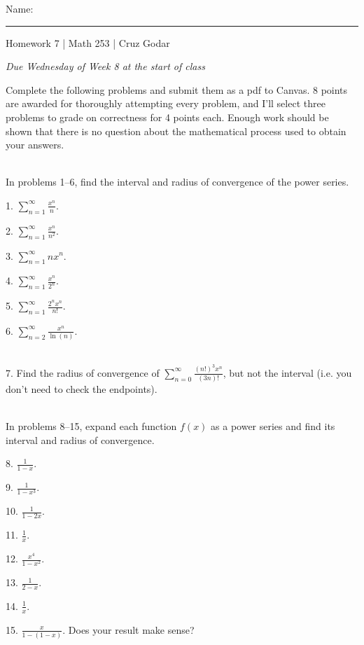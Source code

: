 \documentclass{article}
\begin{document}
\Large Name: \rule{2in}{0.15mm} \hfill Homework 7 | Math 253 | Cruz Godar \vspace{4pt} \normalsize

\textit{Due Wednesday of Week 8 at the start of class}

Complete the following problems and submit them as a pdf to Canvas. 8 points are awarded for thoroughly attempting every problem, and I'll select three problems to grade on correctness for 4 points each. Enough work should be shown that there is no question about the mathematical process used to obtain your answers.

~\\

In problems 1--6, find the interval and radius of convergence of the power series.

1. $\displaystyle \sum_{n = 1}^\infty \frac{x^n}{n}$.

2. $\displaystyle \sum_{n = 1}^\infty \frac{x^n}{n^2}$.

3. $\displaystyle \sum_{n = 1}^\infty nx^n$.

4. $\displaystyle \sum_{n = 1}^\infty \frac{x^n}{2^n}$.

5. $\displaystyle \sum_{n = 1}^\infty \frac{2^n x^n}{n!}$.

6. $\displaystyle \sum_{n = 2}^\infty \frac{x^n}{\ln(n)}$.

~\\

7. Find the radius of convergence of $\displaystyle \sum_{n = 0}^\infty \frac{(n!)^3 x^n}{(3n)!}$, but not the interval (i.e. you don't need to check the endpoints).

~\\

In problems 8--15, expand each function $f(x)$ as a power series and find its interval and radius of convergence.

8. $\displaystyle \frac{1}{1 - x}$.

9. $\displaystyle \frac{1}{1 - x^3}$.

10. $\displaystyle \frac{1}{1 - 2x}$.

11. $\displaystyle \frac{1}{x}$.

12. $\displaystyle \frac{x^4}{1 - x^2}$.

13. $\displaystyle \frac{1}{2 - x}$.

14. $\displaystyle \frac{1}{x}$.

15. $\displaystyle \frac{x}{1 - (1 - x)}$. Does your result make sense?
\end{document}
